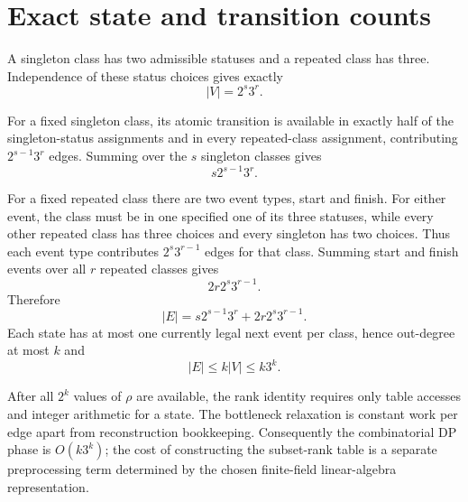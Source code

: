 \section{Exact state and transition counts}

A singleton class has two admissible statuses and a repeated class has three.  Independence of these status choices gives exactly
\[
 |V|=2^s3^r.
\]

For a fixed singleton class, its atomic transition is available in exactly half of the singleton-status assignments and in every repeated-class assignment, contributing $2^{s-1}3^r$ edges.  Summing over the $s$ singleton classes gives
\[
 s2^{s-1}3^r.
\]

For a fixed repeated class there are two event types, start and finish.  For either event, the class must be in one specified one of its three statuses, while every other repeated class has three choices and every singleton has two choices.  Thus each event type contributes $2^s3^{r-1}$ edges for that class.  Summing start and finish events over all $r$ repeated classes gives
\[
 2r2^s3^{r-1}.
\]
Therefore
\[
 |E|=s2^{s-1}3^r+2r2^s3^{r-1}.
\]
Each state has at most one currently legal next event per class, hence out-degree at most $k$ and
\[
 |E|\le k|V|\le k3^k.
\]

After all $2^k$ values of $\rho$ are available, the rank identity requires only table accesses and integer arithmetic for a state.  The bottleneck relaxation is constant work per edge apart from reconstruction bookkeeping.  Consequently the combinatorial DP phase is $O(k3^k)$; the cost of constructing the subset-rank table is a separate preprocessing term determined by the chosen finite-field linear-algebra representation.

